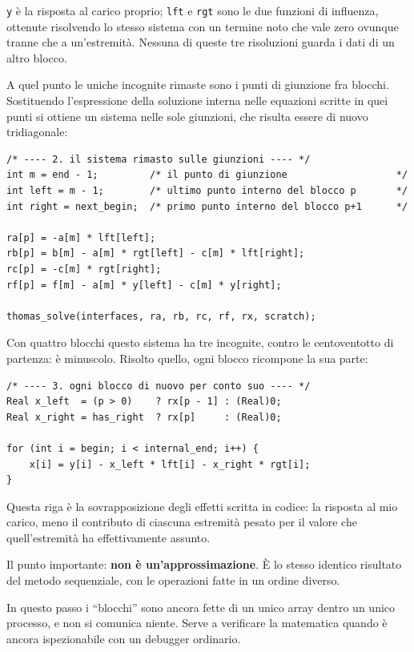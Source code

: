 \documentclass[11pt,a4paper]{article}
\newcommand{\cd}[1]{\texttt{\small #1}}
\begin{document}
\cd{y} è la risposta al carico proprio; \cd{lft} e \cd{rgt} sono le due funzioni
di influenza, ottenute risolvendo lo stesso sistema con un termine noto che vale
zero ovunque tranne che a un'estremità. Nessuna di queste tre risoluzioni guarda
i dati di un altro blocco.

\medskip
A quel punto le uniche incognite rimaste sono i punti di giunzione fra blocchi.
Sostituendo l'espressione della soluzione interna nelle equazioni scritte in
quei punti si ottiene un sistema nelle sole giunzioni, che risulta essere di
nuovo tridiagonale:

\begin{lstlisting}
/* ---- 2. il sistema rimasto sulle giunzioni ---- */
int m = end - 1;         /* il punto di giunzione                   */
int left = m - 1;        /* ultimo punto interno del blocco p       */
int right = next_begin;  /* primo punto interno del blocco p+1      */

ra[p] = -a[m] * lft[left];
rb[p] = b[m] - a[m] * rgt[left] - c[m] * lft[right];
rc[p] = -c[m] * rgt[right];
rf[p] = f[m] - a[m] * y[left] - c[m] * y[right];

thomas_solve(interfaces, ra, rb, rc, rf, rx, scratch);
\end{lstlisting}

Con quattro blocchi questo sistema ha tre incognite, contro le centoventotto di
partenza: è minuscolo. Risolto quello, ogni blocco ricompone la sua parte:

\begin{lstlisting}
/* ---- 3. ogni blocco di nuovo per conto suo ---- */
Real x_left  = (p > 0)    ? rx[p - 1] : (Real)0;
Real x_right = has_right  ? rx[p]     : (Real)0;

for (int i = begin; i < internal_end; i++) {
    x[i] = y[i] - x_left * lft[i] - x_right * rgt[i];
}
\end{lstlisting}

Questa riga è la sovrapposizione degli effetti scritta in codice: la risposta al
mio carico, meno il contributo di ciascuna estremità pesato per il valore che
quell'estremità ha effettivamente assunto.

Il punto importante: \textbf{non è un'approssimazione}. È lo stesso identico
risultato del metodo sequenziale, con le operazioni fatte in un ordine diverso.

In questo passo i ``blocchi'' sono ancora fette di un unico array dentro un
unico processo, e non si comunica niente. Serve a verificare la matematica
quando è ancora ispezionabile con un debugger ordinario.
\end{document}

